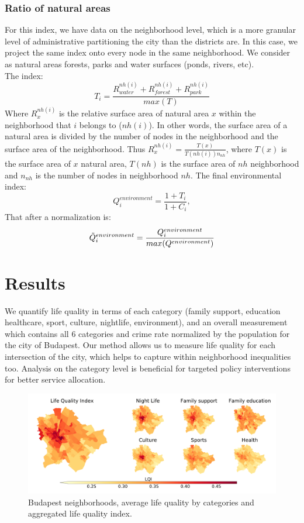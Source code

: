 \subsubsection{Ratio of natural areas}
For this index, we have data on the neighborhood level, which is a more granular level of administrative partitioning the city than the districts are. In this case, we project the same index onto every node in the same neighborhood. We consider as natural areas forests, parks and water surfaces (ponds, rivers, etc). \\
The index:
$$T_i=\frac{R_{water}^{nh(i)}+ R_{forest}^{nh(i)}+R_{park}^{nh(i)}}{max(T)}$$
Where $R_x^{nh(i)}$ is the relative surface area of natural area $x$ within the neighborhood that $i$ belongs to ($nh(i)$). In other words, the surface area of a natural area is divided by the number of nodes in the neighborhood and the surface area of the neighborhood. Thus
$R_x^{nh(i)}=\frac{T(x)}{T(nh(i))n_{nh}}$, where $T(x)$ is the surface area of $x$ natural area, $T(nh)$ is the surface area of $nh$ neighborhood and $n_{nh}$ is the number of nodes in neighborhood $nh$.
The final environmental index:
$$Q_i^{environment}=\frac{1+T_i}{1+C_i},$$
That after a normalization is:
$$\Tilde{Q}_i^{environment}=\frac{Q_i^{environment}}{max(Q^{environment})}$$


\section{Results}
We quantify life quality in terms of each category (family support, education healthcare, sport, culture, nightlife, environment), and an overall measurement which contains all 6 categories and crime rate normalized by the population for the city of Budapest. Our method allows us to measure life quality for each intersection of the city, which helps to capture within neighborhood inequalities too. Analysis on the category level is beneficial for targeted policy interventions for better service allocation.

\begin{figure}[htbp]
	\centering
	\includegraphics[width=\textwidth]{images/lqi/Budapest_LQI_Neighborhoods-eps-converted-to.pdf}
	\caption[Budapest neighborhoods life quality index]{Budapest neighborhoods, average life quality by categories and aggregated life quality index.}
	\label{fig:BPlqi}
\end{figure}

